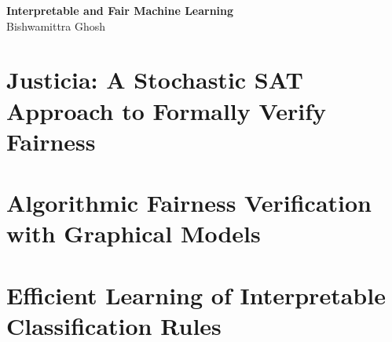\documentclass[12pt]{report}
\begin{document}
	\begin{center}
		\Large \textbf{Interpretable and Fair Machine Learning} \\
		\vspace{1em}
		\large Bishwamittra Ghosh
	\end{center}
	
	
	
	
	
			\chapter{Justicia: A Stochastic SAT Approach to Formally Verify Fairness}
				
				
				
				
				
				
				
				
				
			\chapter{Algorithmic Fairness Verification with Graphical Models}
				
				
				
				
				
				
				
				
				
				
				
			\chapter{Efficient Learning of  Interpretable Classification Rules}
				
				
				
				
				
				
				
				
				
				
				
\end{document}
